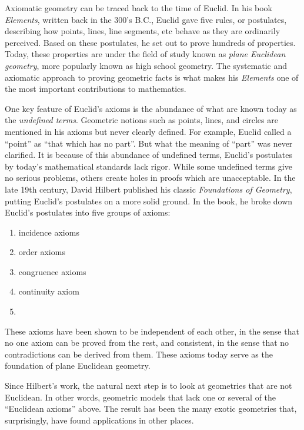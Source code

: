 \documentclass[12pt]{article}
\begin{document}
Axiomatic geometry can be traced back to the time of Euclid.  In his book
\emph{Elements}, written back in the 300's B.C., Euclid gave five rules, or postulates, describing how
points, lines, line segments, etc behave as they are ordinarily
perceived.  Based on these postulates, he set out to prove hundreds of 
properties.  Today, these properties are under the field of study known as 
\emph{plane Euclidean geometry}, more popularly known as high school geometry.  
The systematic and axiomatic approach to proving geometric facts is what makes his \emph{Elements} one of the most important contributions to mathematics.

One key feature of Euclid's axioms is the abundance of what are known today as 
the \emph{undefined terms}.  Geometric notions such as points, lines, and 
circles are mentioned in his axioms but never clearly defined.  For example, Euclid 
called a ``point'' as ``that which has no part''.  But what the meaning of ``part'' was 
never clarified.  It is because of this abundance of undefined terms, Euclid's postulates by 
today's mathematical standards lack rigor.  While some undefined terms give no serious 
problems, others create holes in proofs which are unacceptable.  In the late 19th century, 
David Hilbert published his classic \emph{Foundations of Geometry}, putting Euclid's postulates 
on a more solid ground.  In the book, he broke down Euclid's postulates into five
groups of axioms:
\begin{enumerate}
\item incidence axioms
\item order axioms
\item congruence axioms
\item continuity axiom
\item {}
\end{enumerate}
These axioms have been shown to be independent of each other, in the sense that no one axiom can be 
proved from the rest, and consistent, in the sense that no contradictions can be derived from them.  These 
axioms today serve as the foundation of plane Euclidean geometry.

Since Hilbert's work, the natural next step is to look at geometries that are not Euclidean.  In other words, 
geometric models that lack one or several of the ``Euclidean axioms'' above.  The result has been the many 
exotic geometries that, surprisingly, have found applications in other places.
\end{document}
